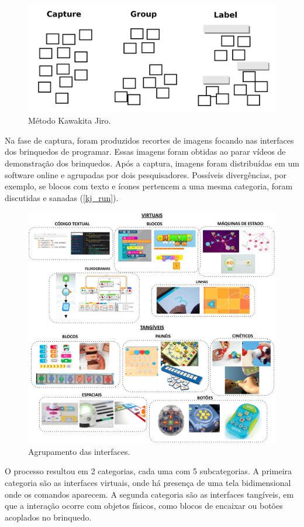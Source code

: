 \begin{figure}[!htbp]
    \centering
    \includegraphics[width=.6\linewidth,fbox]{figs/kj.png}
    \caption{Método Kawakita Jiro.}
    \label{kj}
    \sourceauthor
\end{figure}
Na fase de captura, foram produzidos recortes de imagens focando nas interfaces dos brinquedos de programar. Essas imagens foram obtidas ao parar vídeos de demonstração dos brinquedos. Após a captura, imagens foram distribuídas em um software online e agrupadas por dois pesquisadores. Possíveis divergências, por exemplo, se blocos com texto e ícones pertencem a uma mesma categoria, foram discutidas e sanadas (\autoref{kj_run}).

\begin{figure}
    \centering
    \includegraphics[width=1\linewidth,fbox]{figs/toys_interfaces.png}
    \caption{Agrupamento das interfaces.}
    \label{kj_run}
\end{figure}

O processo resultou em 2 categorias, cada uma com 5 subcategorias. A primeira categoria são as interfaces virtuais, onde há presença de uma tela bidimensional onde os comandos aparecem. A segunda categoria são as interfaces tangíveis, em que a interação ocorre com objetos físicos, como blocos de encaixar ou botões acoplados no brinquedo.


